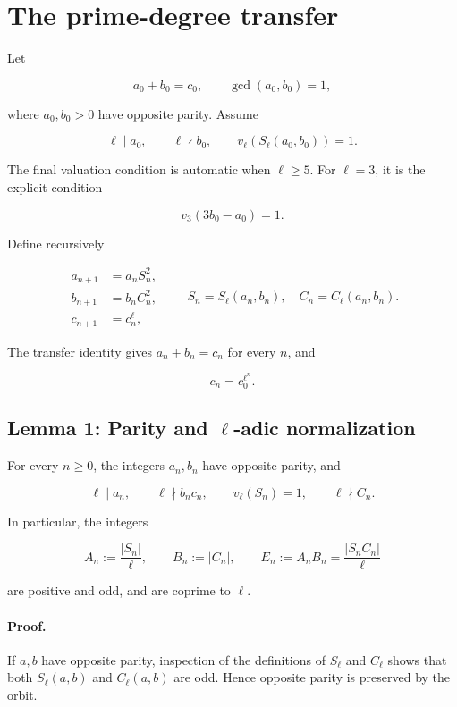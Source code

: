\documentclass[11pt]{article}
\begin{document}
\section{The prime-degree transfer}

Let

\[
a_0+b_0=c_0,
\qquad
\gcd(a_0,b_0)=1,
\]

where \(a_0,b_0>0\) have opposite parity. Assume

\[
\ell\mid a_0,
\qquad
\ell\nmid b_0,
\qquad
v_\ell(S_\ell(a_0,b_0))=1.
\]

The final valuation condition is automatic when \(\ell\geq5\). For
\(\ell=3\), it is the explicit condition

\[
v_3(3b_0-a_0)=1.
\]

Define recursively

\[
\begin{aligned}
a_{n+1}&=a_nS_n^2,\\
b_{n+1}&=b_nC_n^2,\\
c_{n+1}&=c_n^\ell,
\end{aligned}
\qquad
S_n=S_\ell(a_n,b_n),
\quad
C_n=C_\ell(a_n,b_n).
\]

The transfer identity gives \(a_n+b_n=c_n\) for every \(n\), and

\[
c_n=c_0^{\ell^n}.
\]

\subsection{\texorpdfstring{Lemma 1: Parity and \(\ell\)-adic normalization}{Lemma 1: Parity and ell-adic normalization}}

For every \(n\geq0\), the integers \(a_n,b_n\) have opposite parity, and

\[
\ell\mid a_n,
\qquad
\ell\nmid b_nc_n,
\qquad
v_\ell(S_n)=1,
\qquad
\ell\nmid C_n.
\]

In particular, the integers

\[
A_n:=\frac{|S_n|}{\ell},
\qquad
B_n:=|C_n|,
\qquad
E_n:=A_nB_n=\frac{|S_nC_n|}{\ell}
\]

are positive and odd, and are coprime to \(\ell\).

\paragraph{Proof.}

If \(a,b\) have opposite parity, inspection of the definitions of
\(S_\ell\) and \(C_\ell\) shows that both \(S_\ell(a,b)\) and
\(C_\ell(a,b)\) are odd. Hence opposite parity is preserved by the orbit.
\end{document}
